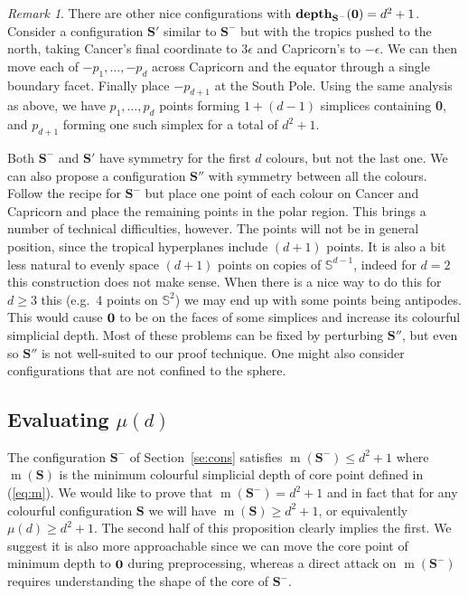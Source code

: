 \documentclass[epsbox,12pt,reqno]{amsart}
\theoremstyle{definition}
\theoremstyle{remark}
\newtheorem{remark}[theorem]{Remark}
\def\csd{\mathbf{depth}}
\def\S{\mathbf{S}}
\def\T{\mathbf{S}''}
\def\Sph{\mathbb{S}}
\def\m{\operatorname{m}}
\def\zero{{\bf 0}}
\begin{document}
\begin{remark}\label{re:alt}
There are other nice configurations with
$\csd_{\S^\minus}(\zero)=d^2+1$.
Consider a configuration $\S'$ similar to $\S^\minus$ but with the tropics
pushed to the north, taking Cancer's final coordinate to $3\epsilon$
and Capricorn's to $-\epsilon$.  We can then move each of
$-p_1, \ldots, -p_d$ across Capricorn and the equator through a
single boundary facet.  Finally place $-p_{d+1}$ at the South Pole.
Using the same analysis as above, we have $p_1, \ldots, p_d$ points 
forming $1+(d-1)$ simplices containing \zero, and $p_{d+1}$
forming one such simplex for a total of $d^2+1$.

Both $\S^\minus$ and $\S'$ have symmetry for the first $d$ colours,
but not the last one.  We can also propose a configuration $\T$
with symmetry between all the colours.  Follow the recipe for
$\S^\minus$ but place one point of each colour on Cancer and Capricorn 
and place the remaining points in the polar region.  
This brings a number of technical
difficulties, however.  The points will not be in general
position, since the tropical hyperplanes include $(d+1)$ points.
It is also a bit less natural to evenly space $(d+1)$ points
on copies of $\Sph^{d-1}$, indeed for $d=2$ this construction
does not make sense.  When there is a nice way to do this for $d \ge 3$
this (e.g.~4 points on $\Sph^2$) we may end up with some points
being antipodes.  This would cause $\zero$ to be on the faces of
some simplices and increase its colourful simplicial depth.  
Most of these problems can be fixed by perturbing $\T$, but even
so $\T$ is not well-suited to our proof technique.
One might also consider configurations that are not confined
to the sphere.
\end{remark}

\subsection{Evaluating $\mu(d)$}\label{se:min}
The configuration $\S^\minus$ of Section~\ref{se:cons} satisfies
$\m(\S^\minus) \le d^2+1$ where $\m(\S)$ is the minimum colourful simplicial
depth of core point defined in (\ref{eq:m}).
We would like to prove that $\m(\S^\minus)=d^2+1$ and in fact
that for any colourful configuration $\S$ we will have
$\m(\S) \ge d^2+1$, or equivalently $\mu(d) \ge d^2+1$.  
The second half of this proposition clearly
implies the first.  We suggest it is also more approachable since 
we can move the core point of minimum depth to $\zero$ during preprocessing,
whereas a direct attack on $\m(\S^\minus)$ requires understanding the
shape of the core of $\S^\minus$.
\end{document}
